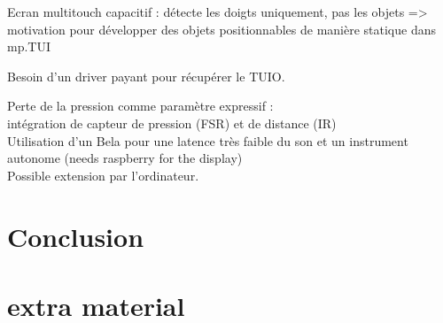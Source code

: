 Ecran multitouch capacitif : détecte les doigts uniquement, pas les objets => motivation pour développer des objets positionnables de manière statique dans mp.TUI

Besoin d'un driver payant pour récupérer le TUIO.

Perte de la pression comme paramètre expressif :\\
intégration de capteur de pression (FSR) et de distance (IR)\\
Utilisation d'un Bela pour une latence très faible du son et un instrument autonome (needs raspberry for the display)\\
Possible extension par l'ordinateur.


\section{Conclusion}
\label{sec:interfaces:conclusion}


\section*{extra material}




 \cite{bin_hands_2017}


